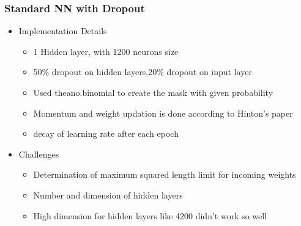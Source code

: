 \documentclass[14pt,mathserif]{beamer}
\begin{document}
\frame
{
  \frametitle{Standard NN with Dropout}
  \begin{itemize}
     \setlength{\itemsep}{1em}
     \item Implementation Details
      \begin{itemize}
      	\item 1 Hidden layer, with 1200 neurons size
        	\item 50\% dropout on hidden layers,20\% dropout on input layer
        	\item Used theano.binomial to create the mask with given probability
        	\item Momentum and weight updation is done according to Hinton's paper
        	\item decay of learning rate after each epoch
        	\end{itemize}
   \end{itemize}
   \begin{itemize}
     \setlength{\itemsep}{1em}
     \item Challenges
     	\begin{itemize}
     	\item Determination of maximum squared length limit for incoming weights
     	\item Number and dimension of hidden layers
     	\item High dimension for hidden layers like 4200 didn't work so well
     	\end{itemize}
  	\end{itemize}
}
\end{document}
